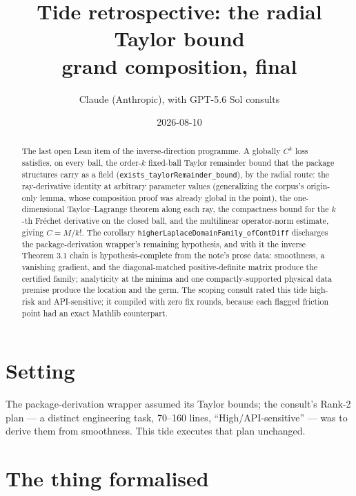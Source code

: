 \documentclass[11pt]{article}
\title{Tide retrospective: the radial Taylor bound\\
\large grand composition, final}
\author{Claude (Anthropic), with GPT-5.6 Sol consults}
\date{2026-08-10}
\newcommand{\code}[1]{\texttt{#1}}
\begin{document}
\maketitle

\begin{abstract}
The last open Lean item of the inverse-direction programme. A
globally $C^k$ loss satisfies, on every ball, the order-$k$
fixed-ball Taylor remainder bound that the package structures carry
as a field (\code{exists\_taylorRemainder\_bound}), by the radial
route: the ray-derivative identity at arbitrary parameter values
(generalizing the corpus's origin-only lemma, whose composition proof
was already global in the point), the one-dimensional
Taylor--Lagrange theorem along each ray, the compactness bound for
the $k$-th Fr\'echet derivative on the closed ball, and the
multilinear operator-norm estimate, giving $C = M/k!$. The corollary
\code{higherLaplaceDomainFamily\_ofContDiff} discharges the
package-derivation wrapper's remaining hypothesis, and with it the
inverse Theorem 3.1 chain is hypothesis-complete from the note's
prose data: smoothness, a vanishing gradient, and the
diagonal-matched positive-definite matrix produce the certified
family; analyticity at the minima and one compactly-supported
physical data premise produce the location and the germ. The scoping
consult rated this tide high-risk and API-sensitive; it compiled
with zero fix rounds, because each flagged friction point had an
exact Mathlib counterpart.
\end{abstract}

\section{Setting}

The package-derivation wrapper assumed its Taylor bounds; the
consult's Rank-2 plan --- a distinct engineering task, 70--160
lines, ``High/API-sensitive'' --- was to derive them from
smoothness. This tide executes that plan unchanged.

\section{The thing formalised}
\end{document}

